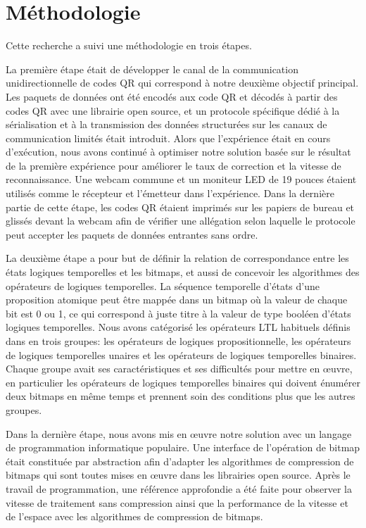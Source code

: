 \section{Méthodologie}

Cette recherche a suivi une méthodologie en trois étapes.

La première étape était de développer le canal de la communication unidirectionnelle de codes QR qui correspond à notre deuxième objectif principal. Les paquets de données ont été encodés aux code QR et décodés à partir des codes QR avec une librairie open source, et un protocole spécifique dédié à la sérialisation et à la transmission des données structurées sur les canaux de communication limités était introduit. Alors que l'expérience était en cours d'exécution, nous avons continué à optimiser notre solution basée sur le résultat de la première expérience pour améliorer le taux de correction et la vitesse de reconnaissance. Une webcam commune et un moniteur LED de 19 pouces étaient utilisés comme le récepteur et l'émetteur dans l'expérience. Dans la dernière partie de cette étape, les codes QR étaient imprimés sur les papiers de bureau et glissés devant la webcam afin de vérifier une allégation selon laquelle le protocole peut accepter les paquets de données entrantes sans ordre.

La deuxième étape a pour but de définir la relation de correspondance entre les états logiques temporelles et les bitmaps, et aussi de concevoir les algorithmes des opérateurs de logiques temporelles. La séquence temporelle d'états d'une proposition atomique peut être mappée dans un bitmap où la valeur de chaque bit est 0 ou 1, ce qui correspond à juste titre à la valeur de type booléen d'états logiques temporelles. Nous avons catégorisé les opérateurs LTL habituels définis dans \cite{huth2004} en trois groupes: les opérateurs de logiques propositionnelle, les opérateurs de logiques temporelles unaires et les opérateurs de logiques temporelles binaires. Chaque groupe avait ses caractéristiques et ses difficultés pour mettre en œuvre, en particulier les opérateurs de logiques temporelles binaires qui doivent énumérer deux bitmaps en même temps et prennent soin des conditions plus que les autres groupes.

Dans la dernière étape, nous avons mis en œuvre notre solution avec un langage de programmation informatique populaire. Une interface de l'opération de bitmap était constituée par abstraction afin d'adapter les algorithmes de compression de bitmaps qui sont toutes mises en œuvre dans les librairies open source. Après le travail de programmation, une référence approfondie a été faite pour observer la vitesse de traitement sans compression ainsi que la performance de la vitesse et de l'espace avec les algorithmes de compression de bitmaps.

